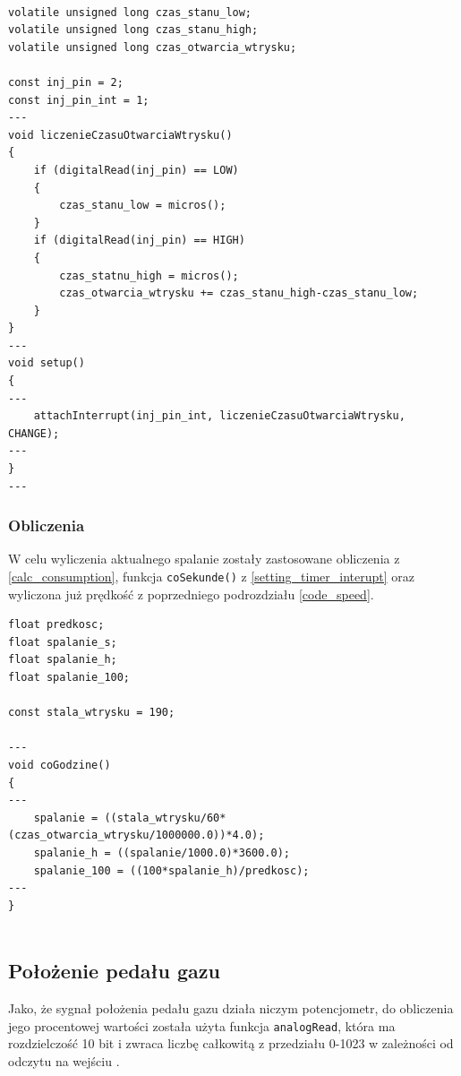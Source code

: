 \begin{lstlisting}[label=list:inj_int,caption=Ustawianie przerwania wtrysku,
basicstyle=\footnotesize\ttfamily]

volatile unsigned long czas_stanu_low;
volatile unsigned long czas_stanu_high;
volatile unsigned long czas_otwarcia_wtrysku;

const inj_pin = 2;
const inj_pin_int = 1;
---
void liczenieCzasuOtwarciaWtrysku()
{
    if (digitalRead(inj_pin) == LOW)
    {
        czas_stanu_low = micros();
    }
    if (digitalRead(inj_pin) == HIGH)
    {
        czas_statnu_high = micros();
        czas_otwarcia_wtrysku += czas_stanu_high-czas_stanu_low;
    }
}
---
void setup()
{
---
    attachInterrupt(inj_pin_int, liczenieCzasuOtwarciaWtrysku, CHANGE);
---
}
---
\end{lstlisting}

\subsubsection{Obliczenia}

W celu wyliczenia aktualnego spalanie zostały zastosowane obliczenia z \ref{calc_consumption}, funkcja \texttt{coSekunde()} z \ref{setting_timer_interupt} oraz wyliczona już prędkość z poprzedniego podrozdziału \ref{code_speed}.

\begin{lstlisting}[label=list:vss_int,caption=Obliczanie aktualnego spalania,
basicstyle=\footnotesize\ttfamily]
float predkosc;
float spalanie_s;
float spalanie_h;
float spalanie_100;

const stala_wtrysku = 190;

---
void coGodzine()
{
---
    spalanie = ((stala_wtrysku/60*(czas_otwarcia_wtrysku/1000000.0))*4.0);
    spalanie_h = ((spalanie/1000.0)*3600.0);
    spalanie_100 = ((100*spalanie_h)/predkosc);
---
}


\end{lstlisting}


\subsection{Położenie pedału gazu}

Jako, że sygnał położenia pedału gazu działa niczym potencjometr, do obliczenia jego procentowej wartości została użyta funkcja \texttt{analogRead}, która ma rozdzielczość 10 bit i zwraca liczbę całkowitą z przedziału 0-1023 w zależności od odczytu na wejściu \cite{ard_ref}.

